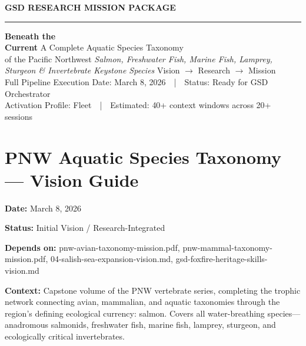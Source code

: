 \documentclass[11pt,letterpaper]{article}
\newcommand{\stageheader}[2]{\noindent\colorbox{#2}{\makebox[\textwidth][l]{\textcolor{white}{\bfseries\sffamily\hspace{6pt}#1\hspace{6pt}}}}\vspace{0.5em}\par}
\newcommand{\metafield}[2]{\textbf{\sffamily #1} #2\par}
\begin{document}
\thispagestyle{empty}
\begin{center}
\vspace*{3cm}
{\small\sffamily\textcolor{primary}{\textbf{GSD RESEARCH MISSION PACKAGE}}}
\vspace{0.3cm}
\textcolor{bordergray}{\rule{8cm}{0.4pt}}
\vspace{1.5cm}
{\fontsize{28}{34}\selectfont\bfseries\sffamily\textcolor{primary}{Beneath the\\[0.3em]Current}}
\vspace{0.8cm}
{\Large\sffamily\textcolor{secondary}{A Complete Aquatic Species Taxonomy\\of the Pacific Northwest}}
\vspace{0.5cm}
{\large\sffamily\itshape\textcolor{tertiary}{Salmon, Freshwater Fish, Marine Fish, Lamprey,\\Sturgeon \& Invertebrate Keystone Species}}
\vspace{3cm}
{\sffamily\textcolor{accent}{Vision $\rightarrow$ Research $\rightarrow$ Mission}}\\[0.3em]
{\small\sffamily\textcolor{accent}{Full Pipeline Execution}}
\vspace{3cm}
{\small\sffamily\textcolor{subtlegray}{Date: March 8, 2026~~|~~Status: Ready for GSD Orchestrator}}\\[0.3em]
{\small\sffamily\textcolor{subtlegray}{Activation Profile: Fleet~~|~~Estimated: 40+ context windows across 20+ sessions}}
\end{center}
\newpage
\tableofcontents
\newpage

\stageheader{STAGE 1 --- VISION DOCUMENT}{primary}

\section{PNW Aquatic Species Taxonomy --- Vision Guide}

\metafield{Date:}{March 8, 2026}
\metafield{Status:}{Initial Vision / Research-Integrated}
\metafield{Depends on:}{pnw-avian-taxonomy-mission.pdf, pnw-mammal-taxonomy-mission.pdf, 04-salish-sea-expansion-vision.md, gsd-foxfire-heritage-skills-vision.md}
\metafield{Context:}{Capstone volume of the PNW vertebrate series, completing the trophic network connecting avian, mammalian, and aquatic taxonomies through the region's defining ecological currency: salmon. Covers all water-breathing species---anadromous salmonids, freshwater fish, marine fish, lamprey, sturgeon, and ecologically critical invertebrates.}
\end{document}
